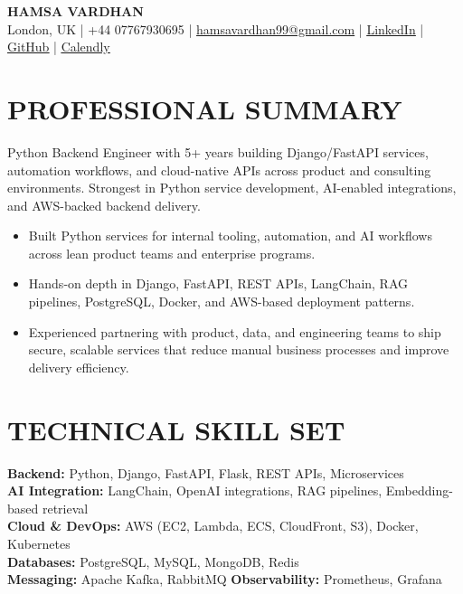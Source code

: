 \documentclass[10pt]{article}
\begin{document}
\begin{center}
{\Large \textbf{HAMSA VARDHAN}}\\[2pt]
London, UK \;|\; +44 07767930695 \;|\;
\href{mailto:hamsavardhan99@gmail.com}{hamsavardhan99@gmail.com} \;|\;
\href{https://linkedin.com/in/hamsa-vardhan}{\underline{LinkedIn}} \;|\;
\href{https://github.com/hamsa-vd}{\underline{GitHub}} \;|\;
\href{https://calendly.com/hamsa-vd/intro-call}{\underline{Calendly}}
\end{center}

\vspace{-2pt}

\section*{PROFESSIONAL SUMMARY}

Python Backend Engineer with 5+ years building Django/FastAPI services, automation workflows, and cloud-native APIs across product and consulting environments. Strongest in Python service development, AI-enabled integrations, and AWS-backed backend delivery.
\begin{itemize}
  \item Built Python services for internal tooling, automation, and AI workflows across lean product teams and enterprise programs.
  \item Hands-on depth in Django, FastAPI, REST APIs, LangChain, RAG pipelines, PostgreSQL, Docker, and AWS-based deployment patterns.
  \item Experienced partnering with product, data, and engineering teams to ship secure, scalable services that reduce manual business processes and improve delivery efficiency.
\end{itemize}

\section*{TECHNICAL SKILL SET}

\textbf{Backend:} Python, Django, FastAPI, Flask, REST APIs, Microservices\\
\textbf{AI Integration:} LangChain, OpenAI integrations, RAG pipelines, Embedding-based retrieval\\
\textbf{Cloud \& DevOps:} AWS (EC2, Lambda, ECS, CloudFront, S3), Docker, Kubernetes\\
\textbf{Databases:} PostgreSQL, MySQL, MongoDB, Redis\\
\textbf{Messaging:} Apache Kafka, RabbitMQ \quad
\textbf{Observability:} Prometheus, Grafana
\end{document}
